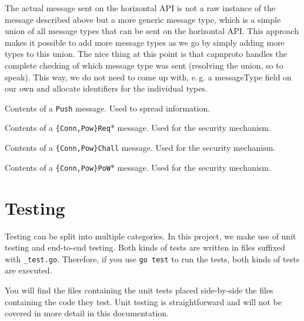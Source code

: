 \documentclass[a4paper,english,10pt,NET]{tumarticle}
\renewcommand{\eg}{\mbox{e.\,g.}\xspace} %
\begin{document}
The actual message sent on the horizontal API is not a raw instance of the message described above but a more generic message type, which is a simple union of all message types that can be sent on the horizontal API.
This approach makes it possible to add more message types as we go by simply adding more types to this union.
The nice thing at this point is that capnproto handles the complete checking of which message type was sent (resolving the union, so to speak).
This way, we do not need to come up with, \eg a messageType field on our own and allocate identifiers for the individual types.

\begin{table}
	\centering
	
	\caption{
		Contents of a \texttt{Push} message.
		Used to spread information.
	}
	\label{tab:push}
\end{table}

\begin{table}
	\centering
	
	\caption{
		Contents of a \texttt{\{Conn,Pow\}Req}* message.
		Used for the security mechanism.
	}
	\label{tab:req}
\end{table}

\begin{table}
	\centering
	
	\caption{
		Contents of a \texttt{\{Conn,Pow\}Chall} message.
		Used for the security mechanism.
	}
	\label{tab:chall}
\end{table}

\begin{table}
	\centering
	
	\caption{
		Contents of a \texttt{\{Conn,Pow\}PoW}* message.
		Used for the security mechanism.
	}
	\label{tab:pow}
\end{table}

\section{Testing} \label{sec:testing}
Testing can be split into multiple categories.
In this project, we make use of unit testing and end-to-end testing.
Both kinds of tests are written in files suffixed with \texttt{\_test.go}.
Therefore, if you use \lstinline{go test} to run the tests, both kinds of tests are executed.

You will find the files containing the unit tests placed side-by-side the files containing the code they test.
Unit testing is straightforward and will not be covered in more detail in this documentation.
\end{document}
